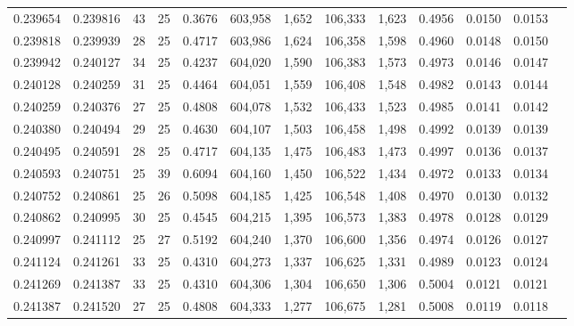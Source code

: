 \begin{tabular}{rrrrrrrrrrrrr}
0.239654 & 0.239816 &  43 &  25 &                                     0.3676 & 603,958 &   1,652 & 106,333 &   1,623 & 0.4956 & 0.0150 & 0.0153 \\
0.239818 & 0.239939 &  28 &  25 &                                     0.4717 & 603,986 &   1,624 & 106,358 &   1,598 & 0.4960 & 0.0148 & 0.0150 \\
0.239942 & 0.240127 &  34 &  25 &                                     0.4237 & 604,020 &   1,590 & 106,383 &   1,573 & 0.4973 & 0.0146 & 0.0147 \\
0.240128 & 0.240259 &  31 &  25 &                                     0.4464 & 604,051 &   1,559 & 106,408 &   1,548 & 0.4982 & 0.0143 & 0.0144 \\
0.240259 & 0.240376 &  27 &  25 &                                     0.4808 & 604,078 &   1,532 & 106,433 &   1,523 & 0.4985 & 0.0141 & 0.0142 \\
0.240380 & 0.240494 &  29 &  25 &                                     0.4630 & 604,107 &   1,503 & 106,458 &   1,498 & 0.4992 & 0.0139 & 0.0139 \\
0.240495 & 0.240591 &  28 &  25 &                                     0.4717 & 604,135 &   1,475 & 106,483 &   1,473 & 0.4997 & 0.0136 & 0.0137 \\
0.240593 & 0.240751 &  25 &  39 &                                     0.6094 & 604,160 &   1,450 & 106,522 &   1,434 & 0.4972 & 0.0133 & 0.0134 \\
0.240752 & 0.240861 &  25 &  26 &                                     0.5098 & 604,185 &   1,425 & 106,548 &   1,408 & 0.4970 & 0.0130 & 0.0132 \\
0.240862 & 0.240995 &  30 &  25 &                                     0.4545 & 604,215 &   1,395 & 106,573 &   1,383 & 0.4978 & 0.0128 & 0.0129 \\
0.240997 & 0.241112 &  25 &  27 &                                     0.5192 & 604,240 &   1,370 & 106,600 &   1,356 & 0.4974 & 0.0126 & 0.0127 \\
0.241124 & 0.241261 &  33 &  25 &                                     0.4310 & 604,273 &   1,337 & 106,625 &   1,331 & 0.4989 & 0.0123 & 0.0124 \\
0.241269 & 0.241387 &  33 &  25 &                                     0.4310 & 604,306 &   1,304 & 106,650 &   1,306 & 0.5004 & 0.0121 & 0.0121 \\
0.241387 & 0.241520 &  27 &  25 &                                     0.4808 & 604,333 &   1,277 & 106,675 &   1,281 & 0.5008 & 0.0119 & 0.0118 \\

\end{tabular}
